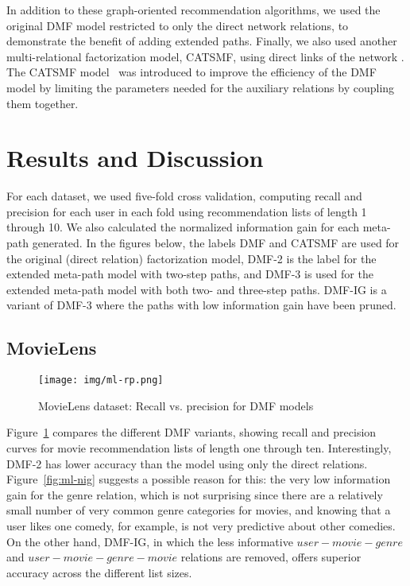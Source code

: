 \documentclass {acmart}
\begin{document}
In addition to these graph-oriented recommendation algorithms, we used the original DMF model restricted to only the direct network relations, to demonstrate the benefit of adding extended paths. Finally, we also used another multi-relational factorization model, CATSMF, using direct links of the network \cite{Drumond:2014:OMF:2661829.2662052}. The CATSMF model~\cite{Drumond:2014:OMF:2661829.2662052} was introduced to improve the efficiency of the DMF model by limiting the parameters needed for the auxiliary relations by coupling them together.

\section{Results and Discussion}

For each dataset, we used five-fold cross validation, computing recall and precision for each user in each fold using recommendation lists of length 1 through 10. We also calculated the normalized information gain for each meta-path generated. In the figures below, the labels DMF and CATSMF are used for the original (direct relation) factorization model, DMF-2 is the label for the extended meta-path model with two-step paths, and DMF-3 is used for the extended meta-path model with both two- and three-step paths. DMF-IG is a variant of DMF-3 where the paths with low information gain have been pruned.

\subsection{MovieLens}

\begin{figure}[tbh]
	\centering
	\texttt{[image: img/ml-rp.png]}
	\caption{\label{fig:Mlresult} MovieLens dataset: Recall vs. precision for DMF models}
\end{figure}

\noindent Figure~\ref{fig:Mlresult} compares the different DMF variants, showing recall and precision curves for movie recommendation lists of length one through ten. Interestingly, DMF-2 has lower accuracy than the model using only the direct relations. Figure~\ref{fig:ml-nig} suggests a possible reason for this: the very low information gain for the genre relation, which is not surprising since there are a relatively small number of very common genre categories for movies, and knowing that a user likes one comedy, for example, is not very predictive about other comedies. On the other hand, DMF-IG, in which the less informative $user-movie-genre$ and $user-movie-genre-movie$ relations are removed, offers superior accuracy across the different list sizes. 
\end{document}
